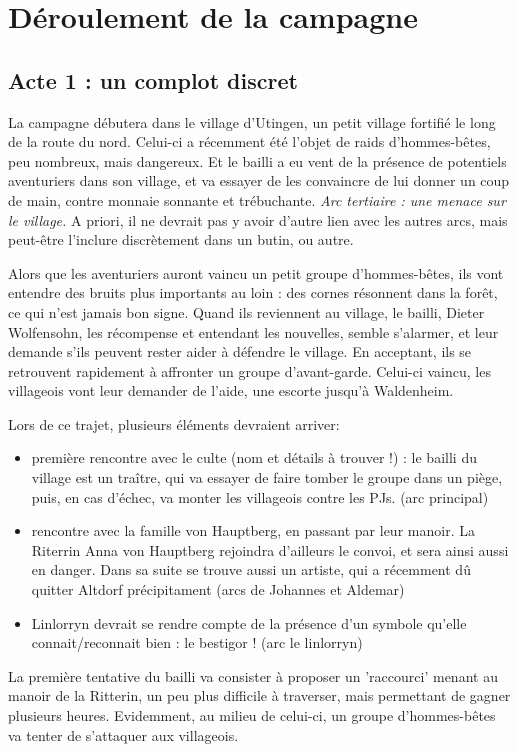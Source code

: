 \documentclass[10pt,a4paper]{book}
\begin{document}
\chapter{Déroulement de la campagne}
\section{Acte 1 : un complot discret}
La campagne débutera dans le village d'Utingen, un petit village fortifié le long de la route du nord. Celui-ci a récemment été l'objet de raids d'hommes-bêtes, peu nombreux, mais dangereux. Et le bailli a eu vent de la présence de potentiels aventuriers dans son village, et va essayer de les convaincre de lui donner un coup de main, contre monnaie sonnante et trébuchante. \emph{Arc tertiaire : une menace sur le village.} A priori, il ne devrait pas y avoir d'autre lien avec les autres arcs, mais peut-être l'inclure discrètement dans un butin, ou autre. 

Alors que les aventuriers auront vaincu un petit groupe d'hommes-bêtes, ils vont entendre des bruits plus importants au loin : des cornes résonnent dans la forêt, ce qui n'est jamais bon signe. Quand ils reviennent au village, le bailli, Dieter Wolfensohn, les récompense et entendant les nouvelles, semble s'alarmer, et leur demande s'ils peuvent rester aider à défendre le village. En acceptant, ils se retrouvent rapidement à affronter un groupe d'avant-garde. Celui-ci vaincu, les villageois vont leur demander de l'aide, une escorte jusqu'à Waldenheim.

Lors de ce trajet, plusieurs éléments devraient arriver:
\begin{itemize}
\item première rencontre avec le culte (nom et détails à trouver !) : le bailli du village est un traître, qui va essayer de faire tomber le groupe dans un piège, puis, en cas d'échec, va monter les villageois contre les PJs. (arc principal)
\item rencontre avec la famille von Hauptberg, en passant par leur manoir. La Riterrin Anna von Hauptberg rejoindra d'ailleurs le convoi, et sera ainsi aussi en danger. Dans sa suite se trouve aussi un artiste, qui a récemment dû quitter Altdorf précipitament (arcs de Johannes et Aldemar)
\item Linlorryn devrait se rendre compte de la présence d'un symbole qu'elle connait/reconnait bien : le bestigor ! (arc le linlorryn)
\end{itemize}

La première tentative du bailli va consister à proposer un 'raccourci' menant au manoir de la Ritterin, un peu plus difficile à traverser, mais permettant de gagner plusieurs heures. Evidemment, au milieu de celui-ci, un groupe d'hommes-bêtes va tenter de s'attaquer aux villageois.
\end{document}
